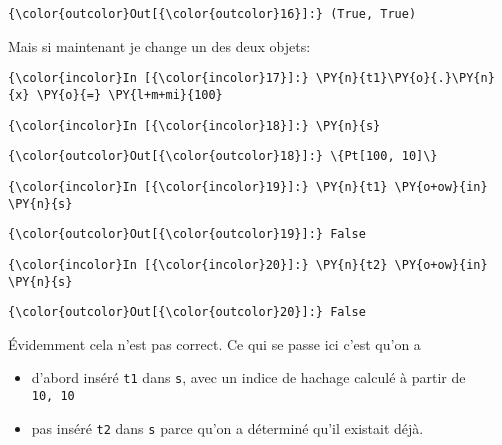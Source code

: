 \begin{Verbatim}[commandchars=\\\{\}]
{\color{outcolor}Out[{\color{outcolor}16}]:} (True, True)
\end{Verbatim}
            
    Mais si maintenant je change un des deux objets:

    \begin{Verbatim}[commandchars=\\\{\}]
{\color{incolor}In [{\color{incolor}17}]:} \PY{n}{t1}\PY{o}{.}\PY{n}{x} \PY{o}{=} \PY{l+m+mi}{100}
\end{Verbatim}


    \begin{Verbatim}[commandchars=\\\{\}]
{\color{incolor}In [{\color{incolor}18}]:} \PY{n}{s}
\end{Verbatim}


\begin{Verbatim}[commandchars=\\\{\}]
{\color{outcolor}Out[{\color{outcolor}18}]:} \{Pt[100, 10]\}
\end{Verbatim}
            
    \begin{Verbatim}[commandchars=\\\{\}]
{\color{incolor}In [{\color{incolor}19}]:} \PY{n}{t1} \PY{o+ow}{in} \PY{n}{s}
\end{Verbatim}


\begin{Verbatim}[commandchars=\\\{\}]
{\color{outcolor}Out[{\color{outcolor}19}]:} False
\end{Verbatim}
            
    \begin{Verbatim}[commandchars=\\\{\}]
{\color{incolor}In [{\color{incolor}20}]:} \PY{n}{t2} \PY{o+ow}{in} \PY{n}{s}
\end{Verbatim}


\begin{Verbatim}[commandchars=\\\{\}]
{\color{outcolor}Out[{\color{outcolor}20}]:} False
\end{Verbatim}
            
    Évidemment cela n'est pas correct. Ce qui se passe ici c'est qu'on a

\begin{itemize}
\tightlist
\item
  d'abord inséré \texttt{t1} dans \texttt{s}, avec un indice de hachage
  calculé à partir de \texttt{10,\ 10}
\item
  pas inséré \texttt{t2} dans \texttt{s} parce qu'on a déterminé qu'il
  existait déjà.
\end{itemize}

